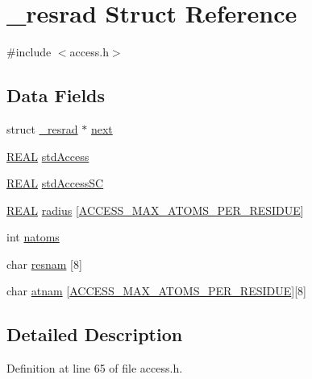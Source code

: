 \hypertarget{struct__resrad}{\section{\-\_\-resrad Struct Reference}
\label{struct__resrad}
}


{\ttfamily \#include $<$access.\-h$>$}

\subsection*{Data Fields}
\begin{DoxyCompactItemize}
\item 
struct \hyperlink{struct__resrad}{\-\_\-resrad} $\ast$ \hyperlink{struct__resrad_a695ca7589e88ba7b5a26d6b5078725e9}{next}
\item 
\hyperlink{_math_type_8h_a5821460e95a0800cf9f24c38915cbbde}{R\-E\-A\-L} \hyperlink{struct__resrad_a623678b947bcd2ca2026cd3947bee48c}{std\-Access}
\item 
\hyperlink{_math_type_8h_a5821460e95a0800cf9f24c38915cbbde}{R\-E\-A\-L} \hyperlink{struct__resrad_ac8bc9edea06d92057088a3a500b277d2}{std\-Access\-S\-C}
\item 
\hyperlink{_math_type_8h_a5821460e95a0800cf9f24c38915cbbde}{R\-E\-A\-L} \hyperlink{struct__resrad_aee5b20c4f5853fe287f250c2ab32ec77}{radius} \mbox{[}\hyperlink{access_8h_a9c4aac920d912705ad034f6b59dbdcf1}{A\-C\-C\-E\-S\-S\-\_\-\-M\-A\-X\-\_\-\-A\-T\-O\-M\-S\-\_\-\-P\-E\-R\-\_\-\-R\-E\-S\-I\-D\-U\-E}\mbox{]}
\item 
int \hyperlink{struct__resrad_a2093ca3426a8f98873fe165a55bfa2b1}{natoms}
\item 
char \hyperlink{struct__resrad_a6f47476bfe0dd0abc0ade4a21127dfc2}{resnam} \mbox{[}8\mbox{]}
\item 
char \hyperlink{struct__resrad_ac08cbe1b837e92bdf4dae30413c28e04}{atnam} \mbox{[}\hyperlink{access_8h_a9c4aac920d912705ad034f6b59dbdcf1}{A\-C\-C\-E\-S\-S\-\_\-\-M\-A\-X\-\_\-\-A\-T\-O\-M\-S\-\_\-\-P\-E\-R\-\_\-\-R\-E\-S\-I\-D\-U\-E}\mbox{]}\mbox{[}8\mbox{]}
\end{DoxyCompactItemize}


\subsection{Detailed Description}


Definition at line 65 of file access.\-h.



